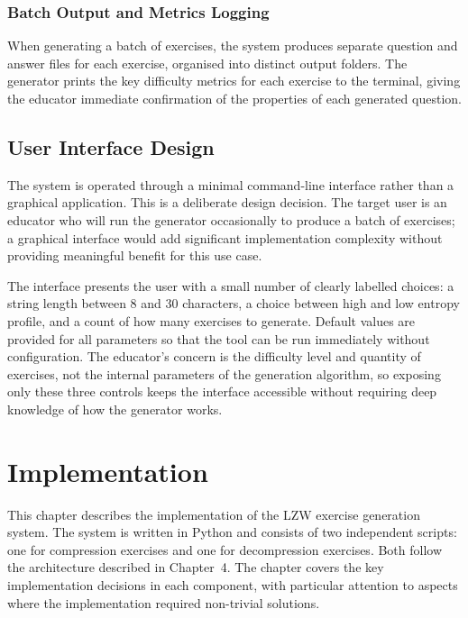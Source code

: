 \documentclass{l4proj}
\begin{document}
\subsection{Batch Output and Metrics Logging}

When generating a batch of exercises, the system produces separate question and answer files for each exercise, organised into distinct output folders. The generator prints the key difficulty metrics for each exercise to the terminal, giving the educator immediate confirmation of the properties of each generated question.

\section{User Interface Design}

The system is operated through a minimal command-line interface rather than a graphical application. This is a deliberate design decision. The target user is an educator who will run the generator occasionally to produce a batch of exercises; a graphical interface would add significant implementation complexity without providing meaningful benefit for this use case.

The interface presents the user with a small number of clearly labelled choices: a  string length between 8 and 30 characters, a choice between high and low entropy profile, and a count of how many exercises to generate. Default values are provided for all parameters so that the tool can be run immediately without configuration. The educator's concern is the difficulty level and quantity of exercises, not the internal parameters of the generation algorithm, so exposing only these three controls keeps the interface accessible without requiring deep knowledge of how the generator works.


\chapter{Implementation}

This chapter describes the implementation of the LZW exercise generation system. The system is written in Python and consists of two independent scripts: one for compression exercises and one for decompression exercises. Both follow the architecture described in Chapter~4. The chapter covers the key implementation decisions in each component, with particular attention to aspects where the implementation required non-trivial solutions.
\end{document}
